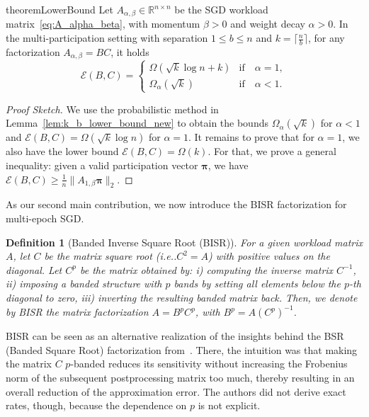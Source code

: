 \documentclass{article} %
\makeatletter
\newtheorem{definition}{Definition}
\DeclareRobustCommand\onedot{\futurelet\@let@token\@onedot}
\def\@onedot{\ifx\@let@token.\else.\null\fi\xspace}
\def\ie{{i.e}\onedot} \def\Ie{{I.e}\onedot}
\newcommand{\R}{\mathbb{R}}
\makeatother
\begin{document}
\begin{restatable}{theorem}{LowerBound}
\label{thm:lowerbound}
Let $A_{\alpha, \beta}\in\R^{n\times n}$ be the SGD workload matrix~\eqref{eq:A_alpha_beta}, with momentum $\beta >0$ and weight decay $\alpha > 0$.
%
In the multi-participation setting with separation $1\le b \leq n$ and $k = \lceil\frac{n}{b}\rceil$,
for any factorization $A_{\alpha, \beta} = BC$, it holds 
\begin{equation}
\mathcal{E}(B,C) = \begin{cases}
\Omega( \sqrt{k}\log n + k) &\text{if} \quad \alpha = 1,\\
\Omega_{\alpha}( \sqrt{k}) &\text{if} \quad \alpha < 1.
\end{cases}\label{eq:lowerbound}
\end{equation}
\end{restatable}
\begin{proof}
    [Proof Sketch]
We use the probabilistic method in Lemma~\ref{lem:k_b_lower_bound_new} to obtain the bounds $\Omega_{\alpha}(\sqrt{k})$ for $\alpha < 1$ and $\mathcal{E}(B,C) = \Omega(\sqrt{k} \log n)$ for $\alpha = 1$. It remains to prove that for $\alpha = 1$, we also have the lower bound $\mathcal{E}(B,C) = \Omega(k)$. For that, we prove a general inequality: given a valid participation vector $\boldsymbol{\pi}$, we have $\mathcal{E}(B, C) \ge \tfrac{1}{n} \|A_{1, \beta} \boldsymbol{\pi}\|_2$.
\end{proof}


As our second main contribution, we now introduce the BISR factorization for multi-epoch SGD. 
% 
\begin{definition}[Banded Inverse Square Root (BISR)]
\label{def:bisr}
For a given workload matrix $A$, let $C$ be the matrix square root (\ie $C^2 = A$) with positive values on the diagonal. 
%
Let $C^{p}$ be the matrix obtained by: i) computing the inverse matrix $C^{-1}$, ii) imposing a banded structure with $p$ bands by setting all elements below the $p$-th diagonal to zero, iii) inverting the resulting banded matrix back. Then, we denote by BISR the matrix factorization $A = B^p C^p$, with $B^p = A (C^p)^{-1}$. 
\end{definition}

BISR can be seen as an alternative realization of the insights behind the BSR (Banded Square Root) factorization from~\citet{kalinin2024}. 
%
There, the intuition was that making the matrix $C$ $p$-banded reduces its sensitivity without 
increasing the Frobenius norm of the subsequent postprocessing matrix too much, thereby resulting 
in an overall reduction of the approximation error. 
%
The authors did not derive exact rates, though, because the dependence on $p$ is not explicit.
\end{document}
